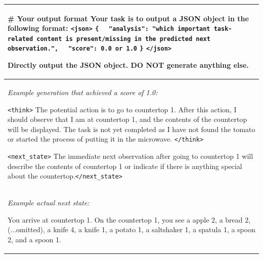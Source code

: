 \begin{table}[t!]
\begin{tabular}{p{16.5cm}}
    \# Your output format
    \newline
    Your task is to output a JSON object in the following format:
    \newline
    \texttt{<json>}
    \newline
    \texttt{\{}
    \newline
    \texttt{\ \ "analysis": "which important task-related content is present/missing in the predicted next observation.",}
    \newline
    \texttt{\ \ "score": 0.0 or 1.0}
    \newline
    \texttt{\}}
    \newline
    \texttt{</json>}

    Directly output the JSON object. DO NOT generate anything else.
    \\
    \midrule
    \emph{Example generation that achieved a score of 1.0:}

    \texttt{<think>} The potential action is to go to countertop 1. After this action, I should observe that I am at countertop 1, and the contents of the countertop will be displayed. The task is not yet completed as I have not found the tomato or started the process of putting it in the microwave. \texttt{</think>}
    
    \texttt{<next\_state>} The immediate next observation after going to countertop 1 will describe the contents of countertop 1 or indicate if there is anything special about the countertop.\texttt{</next\_state>}
    \\
    \midrule
    \emph{Example actual next state:}

    
    You arrive at countertop 1. On the countertop 1, you see a apple 2, a bread 2, (...omitted), a knife 4, a knife 1, a potato 1, a saltshaker 1, a spatula 1, a spoon 2, and a spoon 1. \\
    \bottomrule
    \end{tabular}
\end{table}
